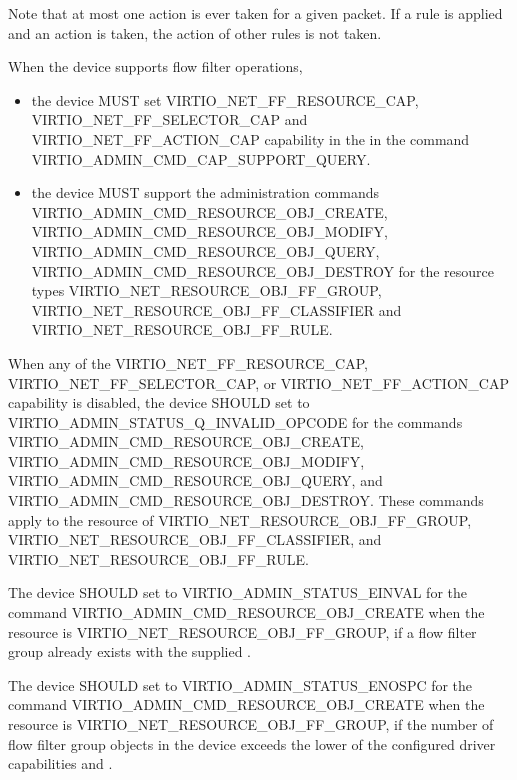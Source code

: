 Note that at most one action is ever taken for a given packet. If a rule is
applied and an action is taken, the action of other rules is not taken.


When the device supports flow filter operations,
\begin{itemize}
\item the device MUST set VIRTIO_NET_FF_RESOURCE_CAP, VIRTIO_NET_FF_SELECTOR_CAP
and VIRTIO_NET_FF_ACTION_CAP capability in the  in the
command VIRTIO_ADMIN_CMD_CAP_SUPPORT_QUERY.
\item the device MUST support the administration commands
VIRTIO_ADMIN_CMD_RESOURCE_OBJ_CREATE,
VIRTIO_ADMIN_CMD_RESOURCE_OBJ_MODIFY, VIRTIO_ADMIN_CMD_RESOURCE_OBJ_QUERY,
VIRTIO_ADMIN_CMD_RESOURCE_OBJ_DESTROY for the resource types
VIRTIO_NET_RESOURCE_OBJ_FF_GROUP, VIRTIO_NET_RESOURCE_OBJ_FF_CLASSIFIER and
VIRTIO_NET_RESOURCE_OBJ_FF_RULE.
\end{itemize}

When any of the VIRTIO_NET_FF_RESOURCE_CAP, VIRTIO_NET_FF_SELECTOR_CAP, or
VIRTIO_NET_FF_ACTION_CAP capability is disabled, the device SHOULD set
 to VIRTIO_ADMIN_STATUS_Q_INVALID_OPCODE for the commands
VIRTIO_ADMIN_CMD_RESOURCE_OBJ_CREATE,
VIRTIO_ADMIN_CMD_RESOURCE_OBJ_MODIFY, VIRTIO_ADMIN_CMD_RESOURCE_OBJ_QUERY,
and VIRTIO_ADMIN_CMD_RESOURCE_OBJ_DESTROY. These commands apply to the resource
 of VIRTIO_NET_RESOURCE_OBJ_FF_GROUP, VIRTIO_NET_RESOURCE_OBJ_FF_CLASSIFIER, and
VIRTIO_NET_RESOURCE_OBJ_FF_RULE.

The device SHOULD set  to VIRTIO_ADMIN_STATUS_EINVAL for the
command VIRTIO_ADMIN_CMD_RESOURCE_OBJ_CREATE when the resource 
is VIRTIO_NET_RESOURCE_OBJ_FF_GROUP, if a flow filter group already exists
with the supplied .

The device SHOULD set  to VIRTIO_ADMIN_STATUS_ENOSPC for the
command VIRTIO_ADMIN_CMD_RESOURCE_OBJ_CREATE when the resource 
is VIRTIO_NET_RESOURCE_OBJ_FF_GROUP, if the number of flow filter group
objects in the device exceeds the lower of the configured driver
capabilities  and .

